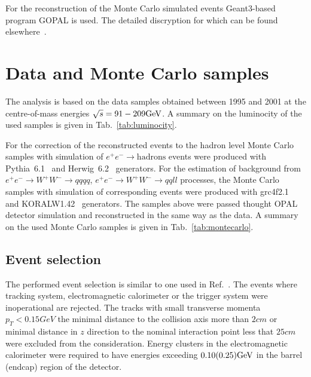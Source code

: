 For the reconstruction of the Monte Carlo simulated events Geant3-based~\cite{Brun:1987ma} program GOPAL
is used. The detailed discryption for which can be found elsewhere~\cite{Allison:1991bf}.

\section{Data and Monte Carlo samples}
\label{sec:selection}
The analysis is based on the data samples obtained between 1995 and 2001 
at the centre-of-mass energies $\sqrt{s}=91-209{\text{Ge}\kern-0.06667em\text{V\/}}$. A summary on the luminocity
of the used samples is given in Tab.~\ref{tab:luminocity}.


\renewcommand{\TABGFONTSIZE}{\tiny}

For the correction of the reconstructed events to the hadron level 
Monte Carlo samples with simulation of $e^+e^-\rightarrow 
\text{hadrons}$ events were produced with Pythia~6.1~\cite{Sjostrand:2000wi} and 
 Herwig~6.2~\cite{Corcella:2000bw} generators.
For the estimation of background  from $e^+e^-\rightarrow W^+W^-\rightarrow qqqq$, 
$e^+e^-\rightarrow W^+W^-\rightarrow qqll$ processes,
 the Monte Carlo samples with simulation of corresponding events 
 were produced with grc4f2.1~\cite{Fujimoto:1996wj} and  KORALW1.42~\cite{Skrzypek:1995wd} generators.
The samples above were passed thought OPAL detector simulation and reconstructed
in the same way as the data.
A summary on  the used Monte Carlo samples is given in Tab.~\ref{tab:montecarlo}.

\renewcommand{\TABGFONTSIZE}{\tiny}


\subsection{Event selection}
\label{sec:selection}
The performed event selection is similar to one used in Ref.~\cite{Abbiendi:2004qz}.
The events where tracking system, electromagnetic calorimeter or the trigger system were inoperational are rejected.
The tracks with small transverse momenta $p_{T}<0.15GeV$ the minimal  distance to the 
collision axis more than $2cm$ or minimal distance in $z$ direction to the nominal interaction point less that $25cm$
were excluded from the consideration. 
Energy clusters in the electromagnetic calorimeter were required to have energies exceeding $0.10(0.25) {\text{Ge}\kern-0.06667em\text{V\/}}$ in 
the barrel (endcap) region of the detector.

